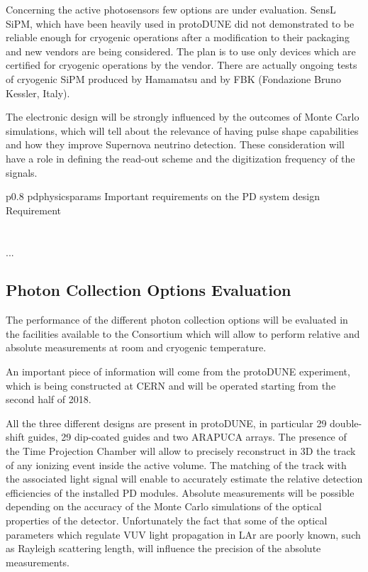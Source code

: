Concerning the active photosensors few options are under evaluation.
SensL SiPM, which have been heavily used in protoDUNE did not demonstrated to 
be reliable enough for cryogenic operations after a modification to their 
packaging and new vendors are being considered. 
The plan is to use only devices which are certified for cryogenic operations 
by the vendor. There are actually ongoing tests of cryogenic SiPM produced by
 Hamamatsu and by FBK (Fondazione Bruno Kessler, Italy).

The electronic design will be strongly influenced by the outcomes of Monte 
Carlo simulations, which will tell about the relevance of having pulse 
shape capabilities and how they improve Supernova neutrino detection. These
consideration will have a role in defining the read-out scheme and the digitization
frequency of the signals.  



\begin{dunetable}
{p{0.8\textwidth}}
{pdphysicsparams}
{Important requirements on the PD system design}   
Requirement  \\ \toprowrule
  \\ \colhline
   \\ \colhline
 ...\\ 
\end{dunetable}


\subsection{Photon Collection Options Evaluation}

The performance of the different photon collection options will be 
evaluated in the facilities available to the Consortium which will allow to perform 
relative and absolute measurements at room and cryogenic temperature.

An important piece of information will come from the protoDUNE experiment, 
which is being constructed at CERN and will be operated starting from the 
second half of 2018.

All the three different designs are present in protoDUNE, in particular 29 
double-shift guides, 29 dip-coated guides and two ARAPUCA arrays. The 
presence of the Time Projection Chamber will allow to precisely reconstruct 
in 3D the track of any ionizing event inside the active volume. The 
matching of the track with the associated light signal will enable to 
accurately estimate the relative detection efficiencies of the installed PD 
modules. 
Absolute measurements will be possible depending on the accuracy of the
Monte Carlo simulations of the optical properties of the detector. 
Unfortunately the fact that  some of the optical parameters which 
regulate VUV light propagation in LAr are poorly known, such as Rayleigh 
scattering length, will influence the precision of the absolute 
measurements.

